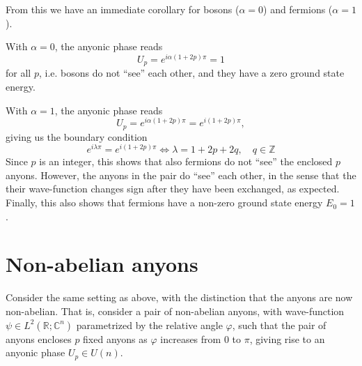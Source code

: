 From this we have an immediate corollary for bosons ($\alpha = 0$) and fermions ($\alpha = 1$).

\begin{corollary}
  With $\alpha = 0$, the anyonic phase reads
  \begin{equation}
    U_p = e^{i\alpha(1+2p)π} = 1
  \end{equation}
  for all $p$, i.e. bosons do not ``see'' each other, and they have a zero ground state energy.

  With $\alpha = 1$, the anyonic phase reads
  \begin{equation}
    U_p = e^{i\alpha(1+2p)π} = e^{i(1+2p)π},
  \end{equation}
  giving us the boundary condition
  \begin{equation}
    e^{iλ π} = e^{i(1+2p)π} \iff λ = 1 + 2p + 2q, \quad q \in \mathbb{Z}
  \end{equation}
  Since $p$ is an integer, this shows that also fermions do not ``see'' the enclosed $p$ anyons.
  However, the anyons in the pair do ``see'' each other, in the sense that the their wave-function changes sign after they have been exchanged, as expected. Finally, this also shows that fermions have a non-zero ground state energy $E_0 = 1$.
\end{corollary}












\section{Non-abelian anyons}

Consider the same setting as above, with the distinction that the anyons are now non-abelian. That is, consider a pair of non-abelian anyons, with wave-function $\psi \in L^2(\mathbb{R}; \mathbb{C}^n)$ parametrized by the relative angle $\varphi$, such that the pair of anyons encloses $p$ fixed anyons as $\varphi$ increases from $0$ to $π$, giving rise to an anyonic phase $U_p \in U(n)$.




